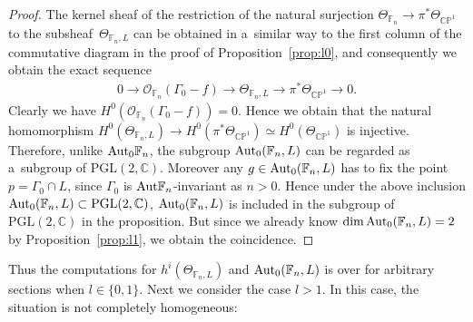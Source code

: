 \documentclass[pdftex]{sigma}
\numberwithin{equation}{section}
\begin{document}
\begin{proof}
The kernel sheaf of the restriction of the natural surjection $\Theta_{\mathbb{F}_n}\to \pi^*\Theta_{\mathbb{CP}^1}$ to
the subsheaf~$\Theta_{\mathbb{F}_n,L}$ can be obtained in a~similar way to the f\/irst column of the commutative diagram
in the proof of Proposition~\ref{prop:l0}, and consequently we obtain the exact sequence
\begin{gather}
\label{ntses}
0
 \longrightarrow
\mathscr O_{\mathbb{F}_n} (\Gamma_0 - f)
 \longrightarrow
\Theta_{\mathbb{F}_n,L}
 \longrightarrow
\pi^*\Theta_{\mathbb{CP}^1}
\longrightarrow
0.
\end{gather}
Clearly we have $H^0 (\mathscr O_{\mathbb{F}_n} (\Gamma_0 - f ) )=0$.
Hence we obtain that the natural homomorphism $H^0(\Theta_{\mathbb{F}_n,L} ) \to H^0( \pi^*\Theta_{\mathbb{CP}^1})\simeq
H^0(\Theta_{\mathbb{CP}^1})$ is injective.
Therefore, unlike ${\rm{Aut}}_0\mathbb{F}_n$, the subgroup ${\rm{Aut}}_0(\mathbb{F}_n,L)$ can be regarded as
a~subgroup of $\mathrm{PGL}(2,\mathbb{C})$.
Moreover any $g\in {\rm{Aut}}_0(\mathbb{F}_n,L)$ has to f\/ix the point $p = \Gamma_0\cap L$, since $\Gamma_0$ is
${\rm{Aut}}\mathbb{F}_n$-invariant as $n>0$.
Hence under the above inclusion ${\rm{Aut}}_0(\mathbb{F}_n,L)\subset\mathrm{PGL}(2,\mathbb{C})$,
${\rm{Aut}}_0(\mathbb{F}_n,L)$ is included in the subgroup of $\mathrm{PGL}(2,\mathbb{C})$ in the proposition.
But since we already know $\dim {\rm{Aut}}_0(\mathbb{F}_n,L)=2$ by Proposition~\ref{prop:l1}, we obtain the coincidence.
\end{proof}

Thus the computations for $h^i(\Theta_{\mathbb{F}_n,L})$ and ${\rm{Aut}}_0(\mathbb{F}_n,L)$ is over for arbitrary
sections when $l\in \{0,1\}$.
Next we consider the case $l>1$.
In this case, the situation is not completely homogeneous:
\end{document}
